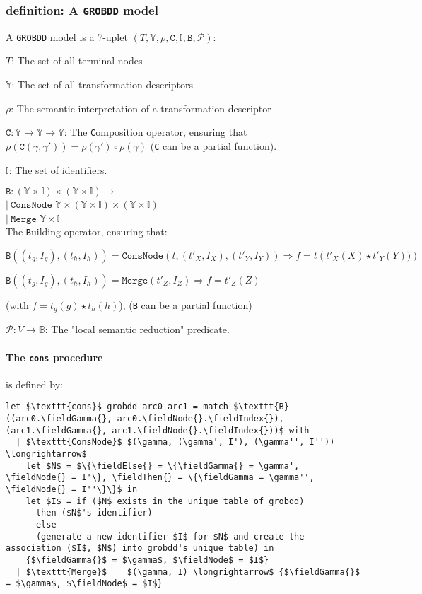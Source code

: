 \documentclass[a4paper,10pt]{article}
\newcommand{\B}{\mathbb{B}}
\newcommand{\Y}{\mathbb{Y}}
\newcommand{\I}{\mathbb{I}}
\newcommand{\GroBdd}{\texttt{GROBDD}}
\newcommand{\fieldIndex}{\texttt{index}}
\newcommand{\fieldNode}{\texttt{node}}
\newcommand{\fieldGamma}{\mathtt{\gamma}}
\newcommand{\fieldThen}{\mathtt{if1}}
\newcommand{\fieldElse}{\mathtt{if0}}
\begin{document}
\subsubsection{definition: A \GroBdd{} model}
{
A \GroBdd{} model is a 7-uplet $(T, \Y, \rho, \texttt{C}, \I, \texttt{B}, \mathcal{P})$:
\begin{compactenum}
\item $T$: The set of all terminal nodes
\item $\Y$: The set of all transformation descriptors
\item $\rho$: The semantic interpretation of a transformation descriptor
\item $\texttt{C}: \Y \longrightarrow \Y \longrightarrow \Y$: The \texttt{C}omposition operator, ensuring that $\rho(\texttt{C}(\gamma, \gamma')) = \rho(\gamma')\circ\rho(\gamma)$ (\texttt{C} can be a partial function).
\item $\I$: The set of identifiers.
\item $\mathtt{B}: (\Y\times\I)\times(\Y\times\I) \longrightarrow$\\
 $|~\texttt{ConsNode}$ $\Y\times (\Y\times\I) \times (\Y\times\I)$\\
 $|~\texttt{Merge}$ $\Y\times\I$\\
The \texttt{B}uilding operator, ensuring that:\begin{compactenum}
\item $\texttt{B}((t_g, I_g), (t_h, I_h))= \texttt{ConsNode} (t, (t'_X, I_X), (t'_Y, I_Y)) \Rightarrow f = t\left(t'_X(X) \star t'_Y(Y))\right)$
\item $\texttt{B}((t_g, I_g), (t_h, I_h))= \texttt{Merge} (t'_Z, I_Z) \Rightarrow f = t'_Z(Z)$
\end{compactenum}
(with $f = t_g(g) \star t_h(h)$), (\texttt{B} can be a partial function)
\item $\mathcal{P}: V\longrightarrow\B$: The "local semantic reduction" predicate.
\end{compactenum}
}

\paragraph{The \texttt{cons} procedure} is defined by:
\begin{lstlisting}
let $\texttt{cons}$ grobdd arc0 arc1 = match $\texttt{B}((arc0.\fieldGamma{}, arc0.\fieldNode{}.\fieldIndex{}), (arc1.\fieldGamma{}, arc1.\fieldNode{}.\fieldIndex{}))$ with
  | $\texttt{ConsNode}$ $(\gamma, (\gamma', I'), (\gamma'', I'')) \longrightarrow$
    let $N$ = $\{\fieldElse{} = \{\fieldGamma{} = \gamma', \fieldNode{} = I'\}, \fieldThen{} = \{\fieldGamma = \gamma'', \fieldNode{} = I''\}\}$ in
    let $I$ = if ($N$ exists in the unique table of grobdd)
      then ($N$'s identifier)
      else
      (generate a new identifier $I$ for $N$ and create the association ($I$, $N$) into grobdd's unique table) in
    {$\fieldGamma{}$ = $\gamma$, $\fieldNode$ = $I$}
  | $\texttt{Merge}$    $(\gamma, I) \longrightarrow$ {$\fieldGamma{}$ = $\gamma$, $\fieldNode$ = $I$}
\end{lstlisting}
\end{document}

